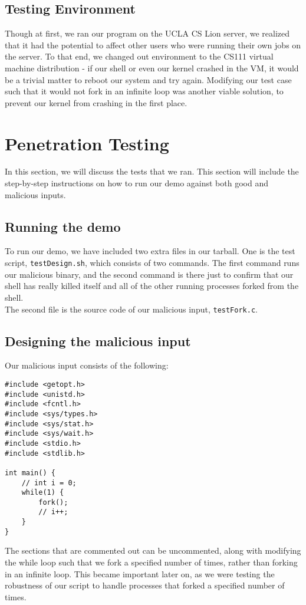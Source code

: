 \documentclass{article}
\begin{document}
\subsection{Testing Environment}
Though at first, we ran our program on the UCLA CS Lion server, we realized
that it had the potential to affect other users who were running their own jobs
on the server. To that end, we changed out environment to the CS111 virtual 
machine distribution - if our shell or even our kernel crashed in the VM, it 
would be a trivial matter to reboot our system and try again. Modifying our 
test case such that it would not fork in an infinite loop was another viable
solution, to prevent our kernel from crashing in the first place. \\


\section{Penetration Testing}

In this section, we will discuss the tests that we ran. This section will
include the step-by-step instructions on how to run our demo against both good
and malicious inputs.

\subsection{Running the demo}
To run our demo, we have included two extra files in our tarball. One is the
test script, \verb+testDesign.sh+, which consists of two commands. The first
command runs our malicious binary, and the second command is there just to
confirm that our shell has really killed itself and all of the other running
processes forked from the shell. \\
The second file is the source code of our malicious input, \verb+testFork.c+.


\subsection{Designing the malicious input}
Our malicious input consists of the following:

\begin{lstlisting}
#include <getopt.h>
#include <unistd.h>
#include <fcntl.h>
#include <sys/types.h>
#include <sys/stat.h>
#include <sys/wait.h>
#include <stdio.h>
#include <stdlib.h>

int main() {
	// int i = 0;
	while(1) {
		fork();
		// i++;
	}
}
\end{lstlisting}
The sections that are commented out can be uncommented, along with modifying 
the while loop such that we fork a specified number of times, rather than
forking in an infinite loop. This became important later on, as we were testing
the robustness of our script to handle processes that forked a specified 
number of times.
\end{document}
